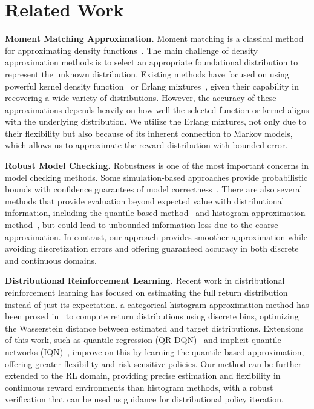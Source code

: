 \section{Related Work}
\label{secRelated}
\noindent \textbf{Moment Matching Approximation.} Moment matching is a classical method for approximating density functions~\cite{john2007techniques, mnatsakanov2009recovery}. The main challenge of density approximation methods is to select an appropriate foundational distribution to represent the unknown distribution. Existing methods have focused on using powerful kernel density function~\cite{gavriliadis2012truncated} or Erlang mixtures~\cite{johnson1989matching, he2022continuous}, given their capability in recovering a wide variety of distributions. However, the accuracy of these approximations depends heavily on how well the selected function or kernel aligns with the underlying distribution. We utilize the Erlang mixtures, not only due to their flexibility but also because of its inherent connection to Markov models, which allows us to approximate the reward distribution with bounded error.

\vspace{1mm}
\noindent \textbf{Robust Model Checking.} Robustness is one of the most important concerns in model checking methods. Some simulation-based approaches provide probabilistic bounds with confidence guarantees of model correctness~\cite{herault2004approximate, pappagallo2020monte}. There are also several methods that provide evaluation beyond expected value with distributional information, including the quantile-based method~\cite{baier2014probabilistic} and histogram approximation method~\cite{elsayed2024distributional}, but could lead to unbounded information loss due to the coarse approximation. In contrast, our approach provides smoother approximation while avoiding discretization errors and offering guaranteed accuracy in both discrete and continuous domains.

\vspace{1mm}
\noindent \textbf{Distributional Reinforcement Learning.} Recent work in distributional reinforcement learning has focused on estimating the full return distribution instead of just its expectation. a categorical histogram approximation method has been prosed in~\cite{bellemare2017distributional} to compute return distributions using discrete bins, optimizing the Wasserstein distance between estimated and target distributions. Extensions of this work, such as quantile regression (QR-DQN)~\cite{dabney2018distributional} and implicit quantile networks (IQN)~\cite{dabney2018implicit}, improve on this by learning the quantile-based approximation, offering greater flexibility and risk-sensitive policies. Our method can be further extended to the RL domain, providing precise estimation and flexibility in continuous reward environments than histogram methods, with a robust verification that can be used as guidance for distributional policy iteration.